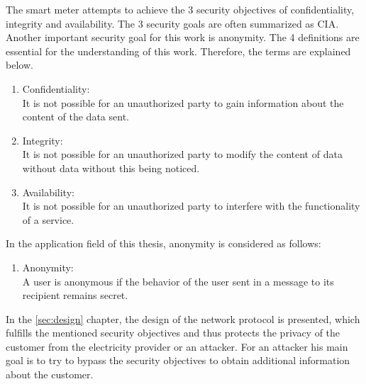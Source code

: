 The smart meter attempts to achieve the 3 security objectives of confidentiality, integrity and availability. The 3 security goals are often summarized as CIA. Another important security goal for this work is anonymity. The 4 definitions are essential for the understanding of this work. Therefore, the terms are explained below.
\begin{enumerate}
\item Confidentiality: \\
It is not possible for an unauthorized party to gain information about the content of the data sent.
\item Integrity:\\
It is not possible for an unauthorized party to modify the content of data without data without this being noticed.
\item Availability: \\
It is not possible for an unauthorized party to interfere with the functionality of a service.
\end{enumerate}
In the application field of this thesis, anonymity is considered as follows:
\begin{enumerate}[resume]
\item Anonymity:\\
A user is anonymous if the behavior of the user sent in a message to its recipient remains secret.
\end{enumerate}
In the \ref{sec:design} chapter, the design of the network protocol is presented, which fulfills the mentioned security objectives and thus protects the privacy of the customer from the electricity provider or an attacker. For an attacker his main goal is to try to bypass the security objectives to obtain additional information about the customer.
